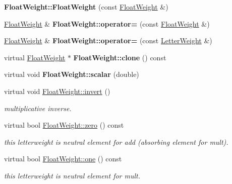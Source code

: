 \begin{DoxyCompactItemize}
\mbox{\label{group__weight_gac7ac9026fecc24193526ef577d819a3b}} 
{\bfseries Float\+Weight\+::\+Float\+Weight} (const \mbox{\hyperlink{classFloatWeight}{Float\+Weight}} \&)
\item 
\mbox{\label{group__weight_ga265949c1cd1d5dbf5888bcd2d4283d52}} 
\mbox{\hyperlink{classFloatWeight}{Float\+Weight}} \& {\bfseries Float\+Weight\+::operator=} (const \mbox{\hyperlink{classFloatWeight}{Float\+Weight}} \&)
\item 
\mbox{\label{group__weight_gafae5ba059c08a25f4bd2ffa422b953c1}} 
\mbox{\hyperlink{classFloatWeight}{Float\+Weight}} \& {\bfseries Float\+Weight\+::operator=} (const \mbox{\hyperlink{classLetterWeight}{Letter\+Weight}} \&)
\item 
\mbox{\label{group__weight_ga3ee8633406a8dc51ba579254872b21e4}} 
virtual \mbox{\hyperlink{classFloatWeight}{Float\+Weight}} $\ast$ {\bfseries Float\+Weight\+::clone} () const
\item 
\mbox{\label{group__weight_ga8fe884fff3323382bfc7729500cca368}} 
virtual void {\bfseries Float\+Weight\+::scalar} (double)
\item 
virtual void \mbox{\hyperlink{group__weight_ga45533bb9d354577728ddb1e0a42c4bab}{Float\+Weight\+::invert}} ()
\begin{DoxyCompactList}\small\item\em multiplicative inverse. \end{DoxyCompactList}\item 
\mbox{\label{group__weight_gafb9e6bffef57c6462cd2eea89efbfeaf}} 
virtual bool \mbox{\hyperlink{group__weight_gafb9e6bffef57c6462cd2eea89efbfeaf}{Float\+Weight\+::zero}} () const
\begin{DoxyCompactList}\small\item\em this letterweight is neutral element for add (absorbing element for mult). \end{DoxyCompactList}\item 
\mbox{\label{group__weight_gac90a90f052aba6f1a03a5238bae96159}} 
virtual bool \mbox{\hyperlink{group__weight_gac90a90f052aba6f1a03a5238bae96159}{Float\+Weight\+::one}} () const
\begin{DoxyCompactList}\small\item\em this letterweight is neutral element for mult. \end{DoxyCompactList}\item 

\end{DoxyCompactItemize}

